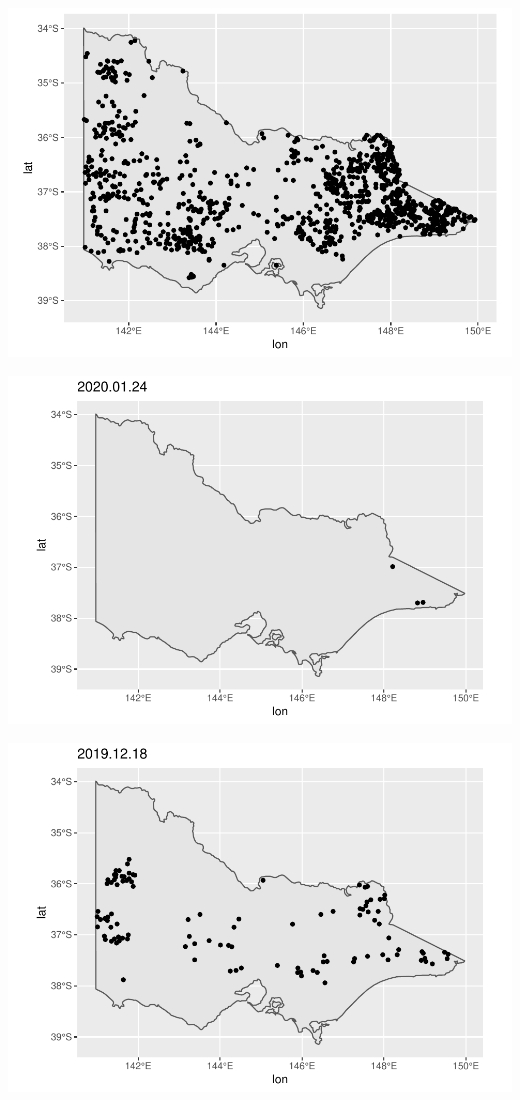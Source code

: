 \begin{Schunk}

\includegraphics[width=0.8\linewidth]{clustering_paper_files/figure-latex/unnamed-chunk-2-1} \end{Schunk}

\begin{Schunk}

\includegraphics[width=0.8\linewidth]{clustering_paper_files/figure-latex/unnamed-chunk-4-1} \end{Schunk}

\begin{Schunk}

\includegraphics[width=0.8\linewidth]{clustering_paper_files/figure-latex/unnamed-chunk-5-1} \end{Schunk}

